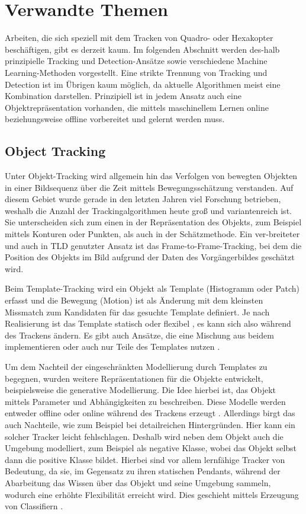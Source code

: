 \section {Verwandte Themen }
\label{section_2}
Arbeiten, die sich speziell mit dem Tracken von Quadro- oder Hexakopter beschäftigen, gibt es derzeit kaum. Im folgenden Abschnitt werden des-halb prinzipielle Tracking und Detection-Ansätze sowie verschiedene Machine Learning-Methoden vorgestellt. Eine strikte Trennung von Tracking und Detection ist im Übrigen kaum möglich, da aktuelle Algorithmen meist eine Kombination darstellen. Prinzipiell ist in jedem Ansatz auch eine Objektrepräsentation vorhanden, die mittels maschinellem Lernen online beziehungsweise offline vorbereitet und gelernt werden muss.

\subsection{Object Tracking}
Unter Objekt-Tracking wird allgemein hin das Verfolgen von bewegten Objekten in einer Bildsequenz über die Zeit mittels Bewegungsschätzung verstanden. Auf diesem Gebiet wurde gerade in den letzten Jahren viel Forschung betrieben, weshalb die Anzahl der Trackingalgorithmen heute groß und variantenreich ist. Sie unterscheiden sich zum einen in der Repräsentation des Objekts, zum Beispiel mittels Konturen oder Punkten, als auch in der Schätzmethode. Ein ver-breiteter und auch in TLD genutzter Ansatz ist das Frame-to-Frame-Tracking, bei dem die Position des Objekts im Bild aufgrund der Daten des Vorgängerbildes geschätzt wird.

Beim Template-Tracking \cite{OPT}\cite{GFT}\cite{KBT} wird ein Objekt als Template (Histogramm oder Patch) erfasst und die Bewegung (Motion) ist als Änderung mit dem kleinsten Missmatch zum Kandidaten für das gesuchte Template definiert. Je nach Realisierung ist das Template statisch\cite{KBT} oder flexibel \cite{OPT}\cite{GFT}, es kann sich also während des Trackens ändern. Es gibt auch Ansätze, die eine Mischung aus beidem implementieren \cite{TUP}\cite{SMAT}\cite{RDT} oder auch nur Teile des Templates nutzen \cite{ROAM}\cite{RFT}.

Um dem Nachteil der eingeschränkten Modellierung durch Templates zu begegnen, wurden weitere Repräsentationen für die Objekte entwickelt, beispielsweise die generative Modellierung. Die Idee hierbei ist, das Objekt mittels Parameter und Abhängigkeiten zu beschreiben. Diese Modelle werden entweder offline \cite{ETR} oder online während des Trackens erzeugt \cite{RFT}\cite{VTD}. Allerdings birgt das auch Nachteile, wie zum Beispiel bei detailreichen Hintergründen. Hier kann ein solcher Tracker leicht fehlschlagen. Deshalb wird neben dem Objekt auch die Umgebung modelliert, zum Beispiel als negative Klasse, wobei das Objekt selbst dann die positive Klasse bildet. Hierbei sind vor allem lernfähige Tracker von Bedeutung, da sie, im Gegensatz zu ihren statischen Pendants, während der Abarbeitung das Wissen über das Objekt und seine Umgebung sammeln, wodurch eine erhöhte Flexibilität erreicht wird. Dies geschieht mittels Erzeugung von Classifiern \cite{ONS}\cite{ENT}\cite{OBT}.

